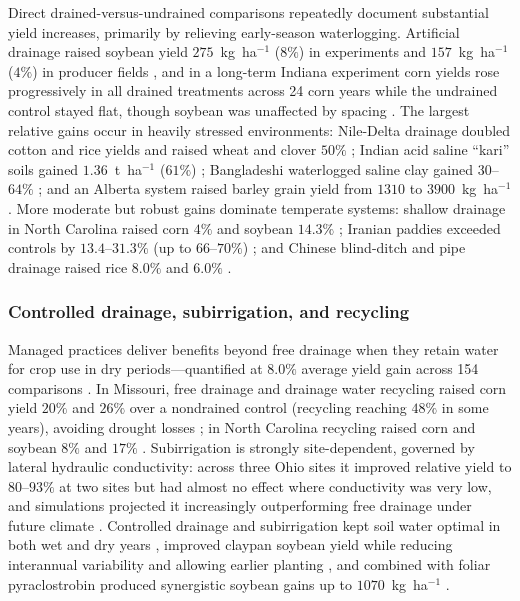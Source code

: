 \documentclass[11pt]{article}
\begin{document}
Direct drained-versus-undrained comparisons repeatedly document substantial
yield increases, primarily by relieving early-season waterlogging. Artificial
drainage raised soybean yield $275$~kg~ha$^{-1}$ ($8\%$) in experiments and
$157$~kg~ha$^{-1}$ ($4\%$) in producer fields \parencite{Mourtzinis2021}, and in
a long-term Indiana experiment corn yields rose progressively in all drained
treatments across 24 corn years while the undrained control stayed flat, though
soybean was unaffected by spacing \parencite{Rui2024,Kladivko2005}. The largest
relative gains occur in heavily stressed environments: Nile-Delta drainage
doubled cotton and rice yields and raised wheat and clover $50\%$
\parencite{ELMOWELHI1988}; Indian acid saline ``kari'' soils gained
$1.36$~t~ha$^{-1}$ ($61\%$) \parencite{Mathew2001}; Bangladeshi waterlogged
saline clay gained $30$--$64\%$ \parencite{Islam2025,Islam2022}; and an Alberta
system raised barley grain yield from $1310$ to $3900$~kg~ha$^{-1}$
\parencite{BENNETT1982}. More moderate but robust gains dominate temperate
systems: shallow drainage in North Carolina raised corn $4\%$ and soybean
$14.3\%$ \parencite{Watkins2024}; Iranian paddies exceeded controls by
$13.4$--$31.3\%$ (up to $66$--$70\%$) \parencite{DarziNaftchali2017b,DarziNaftchali2014};
and Chinese blind-ditch and pipe drainage raised rice $8.0\%$ and $6.0\%$
\parencite{Qi2025b}.

\subsubsection{Controlled drainage, subirrigation, and recycling}

Managed practices deliver benefits beyond free drainage when they retain water
for crop use in dry periods---quantified at $8.0\%$ average yield gain across
154 comparisons \parencite{Singh2022b}. In Missouri, free drainage and drainage
water recycling raised corn yield $20\%$ and $26\%$ over a nondrained control
(recycling reaching $48\%$ in some years), avoiding drought losses
\parencite{Kaur2021}; in North Carolina recycling raised corn and soybean $8\%$
and $17\%$ \parencite{Moursi2024}. Subirrigation is strongly site-dependent,
governed by lateral hydraulic conductivity: across three Ohio sites it improved
relative yield to $80$--$93\%$ at two sites but had almost no effect where
conductivity was very low, and simulations projected it increasingly
outperforming free drainage under future climate \parencite{Gunn2018,Gunn2019}.
Controlled drainage and subirrigation kept soil water optimal in both wet and
dry years \parencite{Niaghi2019}, improved claypan soybean yield while reducing
interannual variability and allowing earlier planting \parencite{Nelson2011},
and combined with foliar pyraclostrobin produced synergistic soybean gains up
to $1070$~kg~ha$^{-1}$ \parencite{Nelson2011b}.
\end{document}
